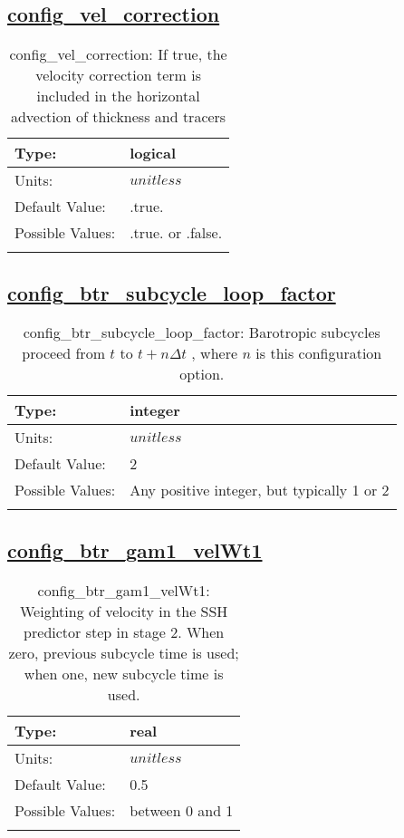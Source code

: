 \subsection[config\_vel\_correction]{\hyperref[sec:nm_tab_split_explicit_ts]{config\_vel\_correction}}
\label{subsec:nm_sec_config_vel_correction}
\begin{center}
\begin{longtable}{| p{2.0in} | p{4.0in} |}
    \hline
    Type: & logical \\
    \hline
    Units: & $unitless$ \\
    \hline
    Default Value: & .true. \\
    \hline
    Possible Values: & .true. or .false. \\
    \hline
    \caption{config\_vel\_correction: If true, the velocity correction term is included in the horizontal advection of thickness and tracers}
\end{longtable}
\end{center}
\subsection[config\_btr\_subcycle\_loop\_factor]{\hyperref[sec:nm_tab_split_explicit_ts]{config\_btr\_subcycle\_loop\_factor}}
\label{subsec:nm_sec_config_btr_subcycle_loop_factor}
\begin{center}
\begin{longtable}{| p{2.0in} | p{4.0in} |}
    \hline
    Type: & integer \\
    \hline
    Units: & $unitless$ \\
    \hline
    Default Value: & 2 \\
    \hline
    Possible Values: & Any positive integer, but typically 1 or 2 \\
    \hline
    \caption{config\_btr\_subcycle\_loop\_factor:  Barotropic subcycles proceed from  $t$  to  $t+n\Delta t$ , where  $n$  is this configuration option.}
\end{longtable}
\end{center}
\subsection[config\_btr\_gam1\_velWt1]{\hyperref[sec:nm_tab_split_explicit_ts]{config\_btr\_gam1\_velWt1}}
\label{subsec:nm_sec_config_btr_gam1_velWt1}
\begin{center}
\begin{longtable}{| p{2.0in} | p{4.0in} |}
    \hline
    Type: & real \\
    \hline
    Units: & $unitless$ \\
    \hline
    Default Value: & 0.5 \\
    \hline
    Possible Values: & between 0 and 1 \\
    \hline
    \caption{config\_btr\_gam1\_velWt1: Weighting of velocity in the SSH predictor step in stage 2.  When zero, previous subcycle time is used; when one, new subcycle time is used.}
\end{longtable}
\end{center}
